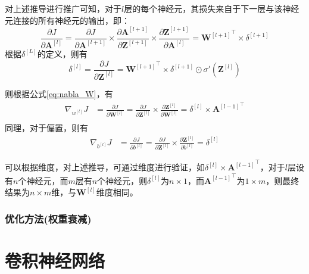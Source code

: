 对上述推导进行推广可知，对于$l$层的每个神经元，其损失来自于下一层与该神经元连接的所有神经元的输出，即：
$$
\frac{\partial J}{\partial \mathbf{A}^{[l]}} = \frac{\partial J}{\partial \mathbf{A}^{[l + 1]}} \times \frac{\partial \mathbf{A}^{[l + 1]}}{\partial \mathbf{Z}^{[l + 1]}} \times \frac{\partial \mathbf{Z}^{[l + 1]}}{\partial \mathbf{A}^{[l]}} = {\mathbf{W} ^{[l + 1]}}^\top \times \delta ^{[l+1]}
$$
根据$\delta ^{[L]}$的定义，则有
\begin{equation}
\delta ^{[l]} = \frac{\partial J}{\partial \mathbf{Z}^{[l]}} = {\mathbf{W} ^{[l + 1]}}^\top \times \delta ^{[l + 1]} \odot \sigma ' \left(\mathbf{Z}^{[l]}\right)
\label{eq:theta_l_with_l_plus_1}
\end{equation}

则根据公式\ref{eq:nabla_W}，有
\begin{equation}
  \begin{aligned}
    \nabla _{w^{[l]}} J &= \frac{\partial J}{\partial \mathbf{W}^{[l]}} = \frac{\partial J}{\partial \mathbf{Z}^{[l]}} \times \frac{\partial \mathbf{Z}^{[l]}}{\partial \mathbf{W}^{[l]}} = \delta^{[l]} \times {\mathbf{A}^{[l - 1]}}^\top \\ 
  \end{aligned}
  \label{eq:nabla_W_l}
\end{equation}
同理，对于偏置，则有
\begin{equation}
  \begin{aligned}
    \nabla _{b^{[l]}} J &= \frac{\partial J}{\partial b^{[l]}} = \frac{\partial J}{\partial \mathbf{Z}^{[l]}} \times \frac{\partial \mathbf{Z}^{[l]}}{\partial b^{[l]}} = \delta ^{[l]}
  \end{aligned}
  \label{eq:nabla_b_l}
\end{equation}

可以根据维度，对上述推导，可通过维度进行验证，如$\delta^{[l]} \times {\mathbf{A}^{[l - 1]}}^\top$，对于$l$层设有$n$个神经元，而$m$层有$n$个神经元，则$\delta^{[l]}$为$n \times 1$，而${\mathbf{A}^{[l - 1]}}^\top$为$1\times m$，则最终结果为$n \times m$维，与$\mathbf{W}^{[l]}$维度相同。

\subsubsection{优化方法(权重衰减)}

\section{卷积神经网络}

